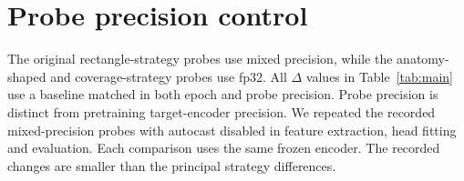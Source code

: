 \section{Probe precision control}
\label{app:fp32}

The original rectangle-strategy probes use mixed precision, while the
anatomy-shaped and coverage-strategy probes use fp32. All $\Delta$ values in
Table~\ref{tab:main} use a baseline matched in both epoch and probe precision.
Probe precision is distinct from pretraining target-encoder precision.
We repeated the recorded mixed-precision probes with autocast disabled in
feature extraction, head fitting and evaluation. Each comparison uses the
same frozen encoder. The recorded changes are smaller than the principal
strategy differences.

\begin{table}[h]
\centering
\caption{Full fp32 re-probe against the original fp16 result, same frozen
encoder in each row. The eight DeLong $p$-values are unadjusted diagnostics, not
a family-wise test. The largest difference is $2\times10^{-4}$.}
\label{tab:fp32}
\small

\end{table}
